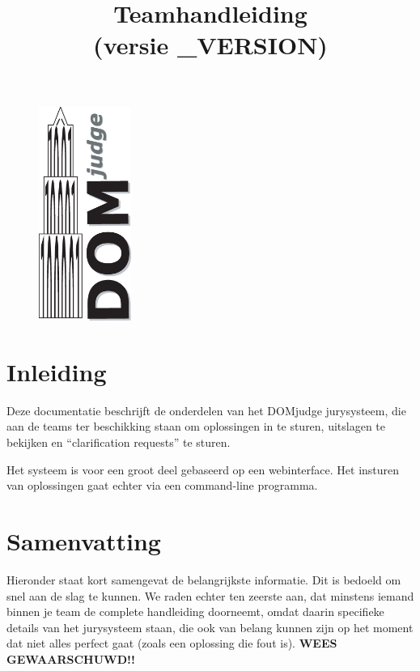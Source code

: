 \documentclass[11pt,a4paper]{article}
\title{Teamhandleiding \DOMjudge\\(versie \DOMJUDGE_VERSION)}
\newcommand{\DOMjudge}{\textsc{DOM}judge }
\begin{document}
\begin{titlepage}
\maketitle
\vspace{1cm}
\begin{figure}[htbp]
\centerline{\includegraphics[height=7cm]{logos/DOMjudgelogo.eps}}
\end{figure}
\end{titlepage}

\newpage
\tableofcontents

\newpage
\section{Inleiding}

Deze documentatie beschrijft de onderdelen van het \DOMjudge
jurysysteem, die aan de teams ter beschikking staan om oplossingen in
te sturen, uitslagen te bekijken en ``clarification requests'' te
sturen.

Het systeem is voor een groot deel gebaseerd op een webinterface. Het
insturen van oplossingen gaat echter via een command-line programma.

\section{Samenvatting}

Hieronder staat kort samengevat de belangrijkste informatie. Dit is
bedoeld om snel aan de slag te kunnen. We raden echter ten zeerste
aan, dat minstens iemand binnen je team de complete handleiding
doorneemt, omdat daarin specifieke details van het jurysysteem staan,
die ook van belang kunnen zijn op het moment dat niet alles perfect
gaat (zoals een oplossing die fout is). \textbf{WEES GEWAARSCHUWD!!}
\end{document}
